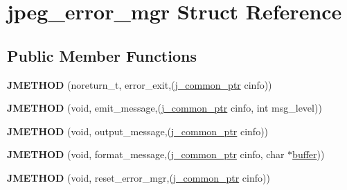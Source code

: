 \hypertarget{structjpeg__error__mgr}{\section{jpeg\+\_\+error\+\_\+mgr Struct Reference}
\label{structjpeg__error__mgr}
}
\subsection*{Public Member Functions}
\begin{DoxyCompactItemize}
\item 
\hypertarget{structjpeg__error__mgr_a72c40bceda2e6cb78046165e6892ac3a}{{\bfseries J\+M\+E\+T\+H\+O\+D} (noreturn\+\_\+t, error\+\_\+exit,(\hyperlink{structjpeg__common__struct}{j\+\_\+common\+\_\+ptr} cinfo))}\label{structjpeg__error__mgr_a72c40bceda2e6cb78046165e6892ac3a}

\item 
\hypertarget{structjpeg__error__mgr_a73c0a027b6e6cb8ff2b7b0fc42f756f9}{{\bfseries J\+M\+E\+T\+H\+O\+D} (void, emit\+\_\+message,(\hyperlink{structjpeg__common__struct}{j\+\_\+common\+\_\+ptr} cinfo, int msg\+\_\+level))}\label{structjpeg__error__mgr_a73c0a027b6e6cb8ff2b7b0fc42f756f9}

\item 
\hypertarget{structjpeg__error__mgr_ac2989f8ef34acdd78ce26a9110a1c094}{{\bfseries J\+M\+E\+T\+H\+O\+D} (void, output\+\_\+message,(\hyperlink{structjpeg__common__struct}{j\+\_\+common\+\_\+ptr} cinfo))}\label{structjpeg__error__mgr_ac2989f8ef34acdd78ce26a9110a1c094}

\item 
\hypertarget{structjpeg__error__mgr_a5f1dfb51c337c36ae1bc5fae7f84528f}{{\bfseries J\+M\+E\+T\+H\+O\+D} (void, format\+\_\+message,(\hyperlink{structjpeg__common__struct}{j\+\_\+common\+\_\+ptr} cinfo, char $\ast$\hyperlink{structbuffer}{buffer}))}\label{structjpeg__error__mgr_a5f1dfb51c337c36ae1bc5fae7f84528f}

\item 
\hypertarget{structjpeg__error__mgr_ac676478083167b3731995d7901bd4b6c}{{\bfseries J\+M\+E\+T\+H\+O\+D} (void, reset\+\_\+error\+\_\+mgr,(\hyperlink{structjpeg__common__struct}{j\+\_\+common\+\_\+ptr} cinfo))}\label{structjpeg__error__mgr_ac676478083167b3731995d7901bd4b6c}

\end{DoxyCompactItemize}
